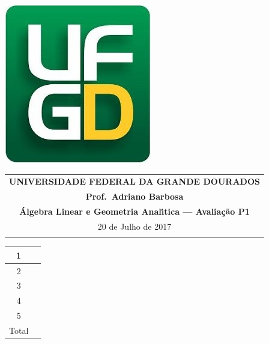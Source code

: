 \documentclass[a4paper,5pt]{amsbook}
\begin{document}
\thispagestyle{empty}
\hspace{-0.6cm}
\begin{minipage}[p]{0.14\linewidth}
	\includegraphics[scale=0.24]{../../ufgd.png}
\end{minipage}
\begin{minipage}[p]{0.7\linewidth}
\begin{tabular}{c}
\toprule{}
{{\bf UNIVERSIDADE FEDERAL DA GRANDE DOURADOS}}\\
{{\bf Prof.\ Adriano Barbosa}}\\

{{\bf \'{A}lgebra Linear e Geometria Anal\'{\i}tica --- Avalia\c{c}\~ao P1}}\\

\midrule{}
\hspace{5cm}20 de Julho de 2017 \\
\bottomrule{}
\end{tabular}
\vspace{-0.45cm}
%
\end{minipage}
\begin{minipage}[p]{0.15\linewidth}
\begin{flushright}
\def\arraystretch{1.2}
\begin{tabular}{|c|c|}  %
\hline\hline  %
1 & \hspace{1.2cm} \\
\hline  %
2& \\
\hline  %
3& \\
\hline  %
4&  \\
\hline  %
5&  \\
\hline  %
{\small Total}&  \\
\hline\hline  %
\end{tabular}
\end{flushright}
\end{minipage}
\end{document}
